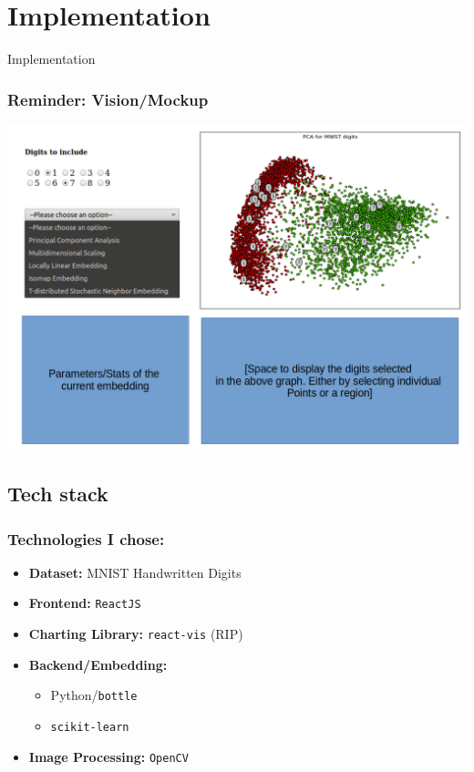 \documentclass[aspectratio=1610]{beamer}
\begin{document}
\section {Implementation}
\begin{frame}
    \begin{centering}
      \huge{Implementation}
    \end{centering}
\end{frame}

\begin{frame}
  \hspace{4em}
  \frametitle{Reminder: Vision/Mockup}
    \begin{centering}
      \includegraphics[height=.5\textwidth]{fig/mockup_va.png}
    \end{centering}

\end{frame}

\subsection {Tech stack}
\begin{frame}
  \frametitle{Technologies I chose:}

  \begin{itemize}
      \item \textbf{Dataset:} MNIST Handwritten Digits %
      \item \textbf{Frontend:} \texttt{ReactJS} %
      \item \textbf{Charting Library:} \texttt{react-vis} {\tiny (RIP)}
      \item \textbf{Backend/Embedding:}  \begin{itemize}
        \item Python/\texttt{bottle}
        \item \texttt{scikit-learn}  %
      \end{itemize}
      \item \textbf{Image Processing:} \texttt{OpenCV}
  \end{itemize}

\end{frame}
\end{document}
